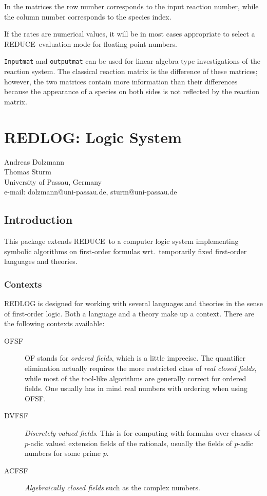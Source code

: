 \documentclass[11pt,letterpaper]{book}
\makeatletter
\newcommand{\REDUCE}{REDUCE}
\newcommand{\underscore}{\_}
\newcommand{\ttindex}[1]{{\renewcommand{\_}{\protect\underscore}%
                          \index{#1@{\tt #1}}}}
\makeatother
\begin{document}
In the matrices the row number corresponds to the input reaction
number, while the column number corresponds to the species index.

If the rates are numerical values, it will be in most cases
appropriate to select a \REDUCE\ evaluation mode for floating point numbers.

{\tt Inputmat} and {\tt outputmat} can be used for linear algebra type
investigations of the reaction system.  The classical reaction
matrix is the difference of these matrices; however, the two
matrices contain more information than their differences because
the appearance of a species on both sides is not reflected by
the reaction matrix.

\chapter{REDLOG: Logic System}
\label{REDLOG}


{\footnotesize
\begin{center}
Andreas Dolzmann \\
Thomas Sturm \\
University of Passau, Germany \\
e-mail: dolzmann@uni-passau.de, sturm@uni-passau.de
\end{center}
}
\ttindex{REDLOG}

\section{Introduction}
This package extends \REDUCE\ to a computer logic system implementing
symbolic algorithms on first-order formulas wrt.~temporarily fixed
first-order languages and theories.

\subsection{Contexts}
REDLOG is designed for working with several languages and theories in
the sense of first-order logic. Both a language and a theory make up a
context. There are the following contexts available:
\begin{description}
\item[\textsc{OFSF}]
\textsc{OF} stands for \emph{ordered fields}, which is a little imprecise.
The quantifier elimination actually requires the more restricted class
of \emph{real closed fields}, while most of the tool-like algorithms
are generally correct for ordered fields. One usually has in mind real
numbers with ordering when using \textsc{OFSF}.

\item[\textsc{DVFSF}]
\emph{Discretely valued fields}. This is for computing with formulas
over classes of $p$-adic valued extension fields of the rationals,
usually the fields of $p$-adic numbers for some prime $p$.

\item[\textsc{ACFSF}]
\emph{Algebraically closed fields} such as the complex numbers.
\end{description}
\end{document}
